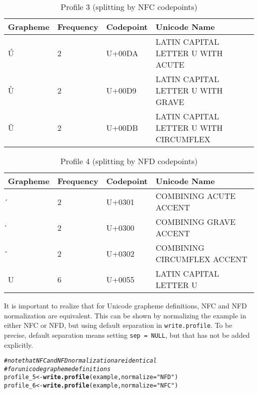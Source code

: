 \documentclass[output=inprep,
		biblatex
		]{LSP/langsci}\usepackage[]{graphicx}\usepackage[]{color}
\makeatletter
\newcommand{\hlstr}[1]{\textcolor[rgb]{0.192,0.494,0.8}{#1}}%
\newcommand{\hlcom}[1]{\textcolor[rgb]{0.678,0.584,0.686}{\textit{#1}}}%
\newcommand{\hlstd}[1]{\textcolor[rgb]{0.345,0.345,0.345}{#1}}%
\newcommand{\hlkwb}[1]{\textcolor[rgb]{0.69,0.353,0.396}{#1}}%
\newcommand{\hlkwc}[1]{\textcolor[rgb]{0.333,0.667,0.333}{#1}}%
\newcommand{\hlkwd}[1]{\textcolor[rgb]{0.737,0.353,0.396}{\textbf{#1}}}%
\newenvironment{kframe}{%
 \def\at@end@of@kframe{}%
 \ifinner\ifhmode%
  \def\at@end@of@kframe{\end{minipage}}%
  \begin{minipage}{\columnwidth}%
 \fi\fi%
 \def\FrameCommand##1{\hskip\@totalleftmargin \hskip-\fboxsep
 \colorbox{shadecolor}{##1}\hskip-\fboxsep
     \hskip-\linewidth \hskip-\@totalleftmargin \hskip\columnwidth}%
 \MakeFramed {\advance\hsize-\width
   \@totalleftmargin\z@ \linewidth\hsize
   \@setminipage}}%
 {\par\unskip\endMakeFramed%
 \at@end@of@kframe}
\newenvironment{knitrout}{}{} %
\makeatother
\begin{document}
\begin{table}[H]
\centering
\begingroup\scriptsize
\begin{tabular}{llll}
  \toprule
Grapheme & Frequency & Codepoint & Unicode Name \\ 
  \midrule
Ú & 2 & U+00DA & LATIN CAPITAL LETTER U WITH ACUTE \\ 
  Ù & 2 & U+00D9 & LATIN CAPITAL LETTER U WITH GRAVE \\ 
  Û & 2 & U+00DB & LATIN CAPITAL LETTER U WITH CIRCUMFLEX \\ 
   \bottomrule
\end{tabular}
\endgroup
\caption{Profile 3 (splitting by NFC codepoints)} 
\label{tab:profile3}
\end{table}


\begin{table}[H]
\centering
\begingroup\scriptsize
\begin{tabular}{llll}
  \toprule
Grapheme & Frequency & Codepoint & Unicode Name \\ 
  \midrule
́ & 2 & U+0301 & COMBINING ACUTE ACCENT \\ 
  ̀ & 2 & U+0300 & COMBINING GRAVE ACCENT \\ 
  ̂ & 2 & U+0302 & COMBINING CIRCUMFLEX ACCENT \\ 
  U & 6 & U+0055 & LATIN CAPITAL LETTER U \\ 
   \bottomrule
\end{tabular}
\endgroup
\caption{Profile 4 (splitting by NFD codepoints)} 
\label{tab:profile4}
\end{table}


It is important to realize that for Unicode grapheme definitions, NFC
and NFD normalization are equivalent. This can be shown by normalizing the
example in either NFC or NFD, but using default separation in
\texttt{write.profile}. To be precise, default separation means setting
\texttt{sep~=~NULL}, but that has not be added explicitly.

\begin{knitrout}\footnotesize
{}\color{fgcolor}\begin{kframe}
\begin{alltt}
\hlcom{# note that NFC and NFD normalization are identical}
\hlcom{# for unicode grapheme definitions}
\hlstd{profile_5} \hlkwb{<-} \hlkwd{write.profile}\hlstd{(example,} \hlkwc{normalize} \hlstd{=} \hlstr{"NFD"}\hlstd{)}
\hlstd{profile_6} \hlkwb{<-} \hlkwd{write.profile}\hlstd{(example,} \hlkwc{normalize} \hlstd{=} \hlstr{"NFC"}\hlstd{)}
\end{alltt}
\end{kframe}
\end{knitrout}
\end{document}
